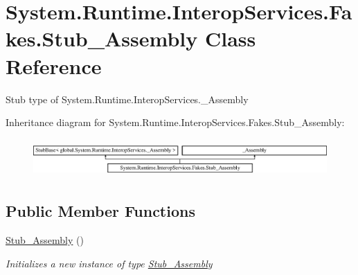\hypertarget{class_system_1_1_runtime_1_1_interop_services_1_1_fakes_1_1_stub___assembly}{\section{System.\-Runtime.\-Interop\-Services.\-Fakes.\-Stub\-\_\-\-Assembly Class Reference}
\label{class_system_1_1_runtime_1_1_interop_services_1_1_fakes_1_1_stub___assembly}
}


Stub type of System.\-Runtime.\-Interop\-Services.\-\_\-\-Assembly 


Inheritance diagram for System.\-Runtime.\-Interop\-Services.\-Fakes.\-Stub\-\_\-\-Assembly\-:\begin{figure}[H]
\begin{center}
\leavevmode
\includegraphics[height=1.469816cm]{class_system_1_1_runtime_1_1_interop_services_1_1_fakes_1_1_stub___assembly}
\end{center}
\end{figure}
\subsection*{Public Member Functions}
\begin{DoxyCompactItemize}
\item 
\hyperlink{class_system_1_1_runtime_1_1_interop_services_1_1_fakes_1_1_stub___assembly_a00389c80d23a5eb59edb6d2a61f2763d}{Stub\-\_\-\-Assembly} ()
\begin{DoxyCompactList}\small\item\em Initializes a new instance of type \hyperlink{class_system_1_1_runtime_1_1_interop_services_1_1_fakes_1_1_stub___assembly}{Stub\-\_\-\-Assembly}\end{DoxyCompactList}\end{DoxyCompactItemize}
